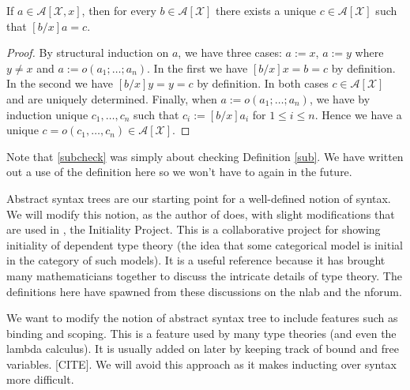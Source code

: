 \begin{cor}\label{subcheck}
    If $a \in \mathcal{A}[\mathcal{X},x]$, then for every $b \in \mathcal{A}[\mathcal{X}]$ there exists a unique $c \in \mathcal{A}[\mathcal{X}]$ such that $[b/x]a = c$.
\end{cor}
\begin{proof}
    By structural induction on $a$, we have three cases: $a := x$, $a:=y$ where $y \ne x$ and $a := o(a_1; \dots; a_n)$. In the first we have $[b/x]x=b=c$ by definition. In the second we have $[b/x]y=y=c$ by definition. In both cases $c \in \mathcal{A}[\mathcal{X}]$ and are uniquely determined. Finally, when $a := o(a_1; \dots; a_n)$, we have by induction unique $c_1,\dots, c_n$ such that $c_i:=[b/x]a_i$ for $1 \le i \le n$. Hence we have a unique $c=o(c_1,\dots,c_n) \in \mathcal{A}[\mathcal{X}]$.
\end{proof}

\begin{remark}
    Note that \ref{subcheck} was simply about checking Definition \ref{sub}. We have written out a use of the definition here so we won't have to again in the future.
\end{remark}

Abstract syntax trees are our starting point for a well-defined notion of syntax. We will modify this notion, as the author of \cite{harper_2016} does, with slight modifications that are used in \cite{nlab:initiality_project, nlab:initiality_project_-_raw_syntax}, the Initiality Project. This is a collaborative project for showing initiality of dependent type theory (the idea that some categorical model is initial in the category of such models). It is a useful reference because it has brought many mathematicians together to discuss the intricate details of type theory. The definitions here have spawned from these discussions on the nlab and the nforum.

We want to modify the notion of abstract syntax tree to include features such as binding and scoping. This is a feature used by many type theories (and even the lambda calculus). It is usually added on later by keeping track of bound and free variables. [CITE]. We will avoid this approach as it makes inducting over syntax more difficult.



